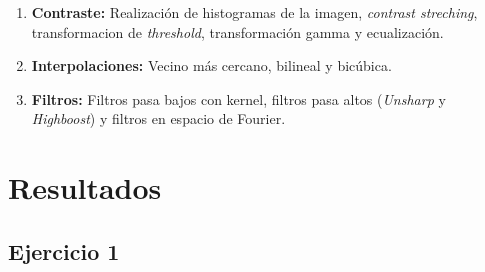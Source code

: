 \documentclass[11pt, twocolumn]{article}
\begin{document}
\begin{enumerate}
  \item \textbf{Contraste:} Realización de histogramas de la imagen, \textit{contrast streching}, transformacion de \textit{threshold}, transformación gamma y ecualización.
  \item \textbf{Interpolaciones:} Vecino más cercano, bilineal y bicúbica.
  \item \textbf{Filtros:} Filtros pasa bajos con kernel, filtros pasa altos (\textit{Unsharp} y \textit{Highboost}) y filtros en espacio de Fourier.
  
\end{enumerate}


\section{Resultados}


\subsection*{Ejercicio 1}
\end{document}

